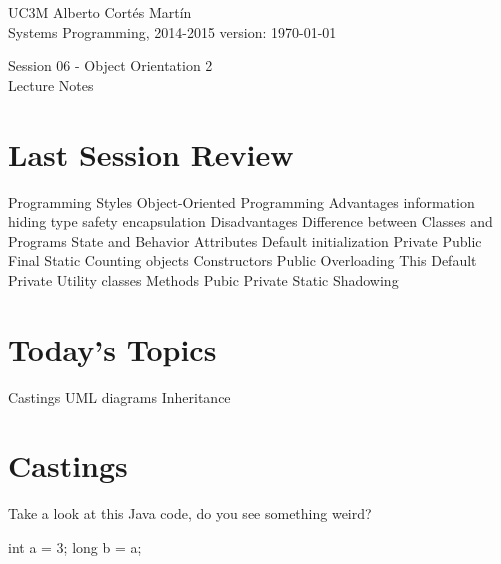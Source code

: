 \documentclass[a4paper, 9pt]{extarticle}
\newcommand{\realtitle}{Session 06 - Object Orientation 2}
\begin{document}
\makebox[\linewidth]{\rule{\textwidth}{0.4pt}}
UC3M \hfill Alberto Cortés Martín\\
Systems Programming, 2014-2015 \hfill version: \today\\
\makebox[\linewidth]{\rule{\textwidth}{0.4pt}}
\begin{center}
  \Large{\realtitle}\\Lecture Notes
\end{center}
\makebox[\linewidth]{\rule{\textwidth}{0.4pt}}
\vspace{1cm}

\section{Last Session Review}

\begin{blackboard}
Programming Styles
Object-Oriented Programming
  Advantages
    information hiding
    type safety
    encapsulation
  Disadvantages
Difference between Classes and Programs
State and Behavior
Attributes
  Default initialization
  Private
  Public
  Final
  Static
    Counting objects
Constructors
  Public
  Overloading
  This
  Default
  Private
    Utility classes
Methods
  Pubic
  Private
  Static
Shadowing
\end{blackboard}









\section{Today's Topics}
\begin{blackboard}
Castings
UML diagrams
Inheritance
\end{blackboard}









\section{Castings}

Take a look at this Java code, do you see something weird?

\begin{blackboard}
int a = 3;
long b = a;
\end{blackboard}
\end{document}
